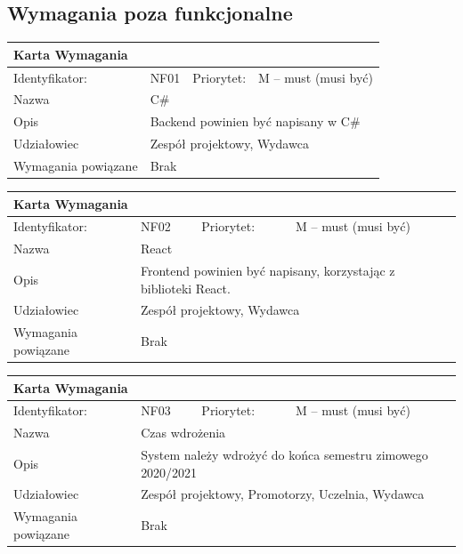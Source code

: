 \documentclass[a4paper,11pt]{report}
\begin{document}
	\subsection {Wymagania poza funkcjonalne}
	\begin{tabular}{|p{3cm}|p{2cm}|p{2cm}|p{6cm}|}
		\hline
		\multicolumn{4}{|p{12 cm}|}{Karta Wymagania}\\
		\hline
		Identyfikator: & NF01 & Priorytet: & M – must (musi być)\\
		\hline
		Nazwa & \multicolumn{3}{|p{10 cm}|}{C\#}\\
		\hline
		Opis & \multicolumn{3}{|p{10 cm}|}{Backend powinien być napisany w C\#}\\
		\hline
		Udziałowiec & \multicolumn{3}{|p{10 cm}|}{Zespół projektowy, Wydawca}\\
		\hline
		Wymagania powiązane & \multicolumn{3}{|p{10 cm}|}{Brak}\\
		\hline
		\end{tabular}
		\newline
		\vspace*{0,2 cm}
		\newline
		\begin{tabular}{|p{3cm}|p{2cm}|p{2cm}|p{6cm}|}
		\hline
		\multicolumn{4}{|p{12 cm}|}{Karta Wymagania}\\
		\hline
		Identyfikator: & NF02 & Priorytet: & M – must (musi być)\\
		\hline
		Nazwa & \multicolumn{3}{|p{10 cm}|}{React}\\
		\hline
		Opis & \multicolumn{3}{|p{10 cm}|}{Frontend powinien być napisany, korzystając z biblioteki React.}\\
		\hline
		Udziałowiec & \multicolumn{3}{|p{10 cm}|}{Zespół projektowy, Wydawca}\\
		\hline
		Wymagania powiązane & \multicolumn{3}{|p{10 cm}|}{Brak}\\
		\hline
		\end{tabular}
		\newline
		\vspace*{0,2 cm}
		\newline
		\begin{tabular}{|p{3cm}|p{2cm}|p{2cm}|p{6cm}|}
		\hline
		\multicolumn{4}{|p{12 cm}|}{Karta Wymagania}\\
		\hline
		Identyfikator: & NF03 & Priorytet: & M – must (musi być)\\
		\hline
		Nazwa & \multicolumn{3}{|p{10 cm}|}{Czas wdrożenia}\\
		\hline
		Opis & \multicolumn{3}{|p{10 cm}|}{System należy wdrożyć do końca semestru zimowego 2020/2021}\\
		\hline
		Udziałowiec & \multicolumn{3}{|p{10 cm}|}{Zespół projektowy, Promotorzy, Uczelnia, Wydawca}\\
		\hline
		Wymagania powiązane & \multicolumn{3}{|p{10 cm}|}{Brak}\\
		\hline
		\end{tabular}
\end{document}
